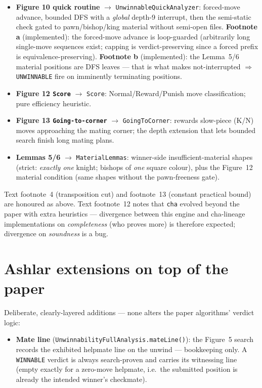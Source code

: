 \documentclass[11pt]{article}
\newcommand{\code}[1]{\texttt{#1}}
\theoremstyle{plain}
\theoremstyle{definition}
\begin{document}
\begin{itemize}[leftmargin=1.4em]
  \item \textbf{Figure 10 quick routine} $\rightarrow$ \code{UnwinnableQuickAnalyzer}: forced-move advance, bounded DFS with a \emph{global} depth-9 interrupt, then the semi-static check gated to pawn/bishop/king material without semi-open files. \textbf{Footnote a} (implemented): the forced-move advance is loop-guarded (arbitrarily long single-move sequences exist; capping is verdict-preserving since a forced prefix is equivalence-preserving). \textbf{Footnote b} (implemented): the Lemma~5/6 material positions are DFS leaves --- that is what makes not-interrupted $\Rightarrow$ \code{UNWINNABLE} fire on imminently terminating positions.
  \item \textbf{Figure 12 \code{Score}} $\rightarrow$ \code{Score}: Normal/Reward/Punish move classification; pure efficiency heuristic.
  \item \textbf{Figure 13 \code{Going-to-corner}} $\rightarrow$ \code{GoingToCorner}: rewards slow-piece (K/N) moves approaching the mating corner; the depth extension that lets bounded search finish long mating plans.
  \item \textbf{Lemmas 5/6} $\rightarrow$ \code{MaterialLemmas}: winner-side insufficient-material shapes (strict: \emph{exactly one} knight; bishops of \emph{one} square colour), plus the Figure~12 material condition (same shapes without the pawn-freeness gate).
\end{itemize}

Text footnote~4 (transposition cut) and footnote~13 (constant practical bound) are honoured as above. Text
footnote~12 notes that \code{cha} evolved beyond the paper with extra heuristics --- divergence between this engine and
cha-lineage implementations on \emph{completeness} (who proves more) is therefore expected; divergence on
\emph{soundness} is a bug.

\section{Ashlar extensions on top of the paper}

Deliberate, clearly-layered additions --- none alters the paper algorithms' verdict logic:

\begin{itemize}[leftmargin=1.4em]
  \item \textbf{Mate line} (\code{UnwinnabilityFullAnalysis.mateLine()}): the Figure~5 search records the exhibited helpmate line on the unwind --- bookkeeping only. A \code{WINNABLE} verdict is always search-proven and carries its witnessing line (empty exactly for a zero-move helpmate, i.e.\ the submitted position is already the intended winner's checkmate).
\end{itemize}
\end{document}
